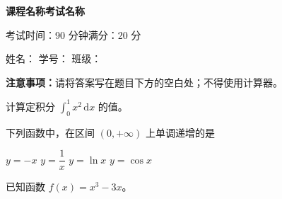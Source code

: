 \documentclass[a4paper,11pt,addpoints]{exam}
\newcommand{\fullmarks}{20}
\begin{document}
\begin{center}
  {\Large\bfseries 课程名称\quad 考试名称\par}
  \medskip
  考试时间：90 分钟\qquad 满分：\fullmarks{} 分
\end{center}

\vspace{1em}
\noindent 姓名：\underline{\makebox[3.5cm]{}}\hfill
学号：\underline{\makebox[3.5cm]{}}\hfill
班级：\underline{\makebox[3cm]{}}

\begin{center}
  \gradetable[h][questions]
\end{center}

\noindent\textbf{注意事项：}请将答案写在题目下方的空白处；不得使用计算器。

\vspace{1em}
\begin{questions}

\question[6] 计算定积分 $\displaystyle\int_{0}^{1} x^{2}\,\mathrm{d}x$ 的值。
\vspace{3cm}

\question[6] 下列函数中，在区间 $(0, +\infty)$ 上单调递增的是
\begin{choices}
  \choice $y = -x$
  \choice $y = \dfrac{1}{x}$
  \choice $y = \ln x$
  \choice $y = \cos x$
\end{choices}
\vspace{1cm}

\question 已知函数 $f(x) = x^{3} - 3x$。

\end{questions}
\end{document}
